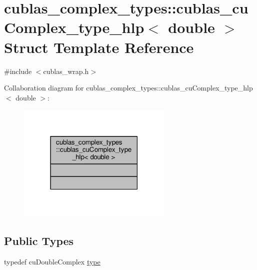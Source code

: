 \hypertarget{structcublas__complex__types_1_1cublas__cuComplex__type__hlp_3_01double_01_4}{\section{cublas\-\_\-complex\-\_\-types\-:\-:cublas\-\_\-cu\-Complex\-\_\-type\-\_\-hlp$<$ double $>$ Struct Template Reference}
\label{structcublas__complex__types_1_1cublas__cuComplex__type__hlp_3_01double_01_4}
}


{\ttfamily \#include $<$cublas\-\_\-wrap.\-h$>$}



Collaboration diagram for cublas\-\_\-complex\-\_\-types\-:\-:cublas\-\_\-cu\-Complex\-\_\-type\-\_\-hlp$<$ double $>$\-:
\nopagebreak
\begin{figure}[H]
\begin{center}
\leavevmode
\includegraphics[width=210pt]{structcublas__complex__types_1_1cublas__cuComplex__type__hlp_3_01double_01_4__coll__graph}
\end{center}
\end{figure}
\subsection*{Public Types}
\begin{DoxyCompactItemize}
\item 
typedef cu\-Double\-Complex \hyperlink{structcublas__complex__types_1_1cublas__cuComplex__type__hlp_3_01double_01_4_a215753d4a8257c8998a5240596a8c2af}{type}
\end{DoxyCompactItemize}


